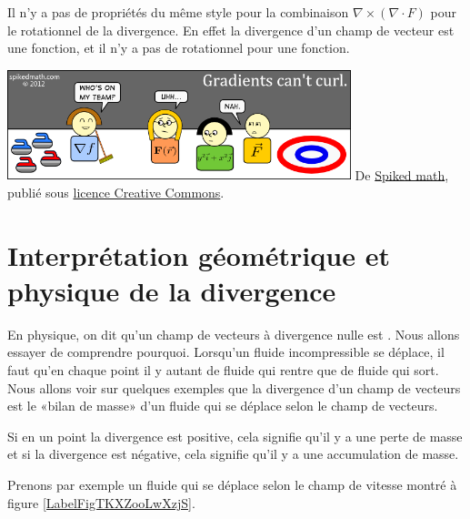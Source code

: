 \begin{remark}
    Il n'y a pas de propriétés du même style pour la combinaison $\nabla\times(\nabla\cdot F)$ pour le rotationnel de la divergence. En effet la divergence d'un champ de vecteur est une fonction, et il n'y a pas de rotationnel pour une fonction.
\end{remark}

\begin{center}
            \includegraphics[width=10cm]{501-curling-with-gradients.png}
        {\tiny De \href{http://spikedmath.com/501.html}{Spiked math}, publié sous \href{http://creativecommons.org/licenses/by-nc-sa/2.5/ca/}{licence Creative Commons}.}
\end{center}


\section[Interprétation de la divergence]{Interprétation géométrique et physique de la divergence}


En physique, on dit qu'un champ de vecteurs à divergence nulle est . Nous allons essayer de comprendre pourquoi. Lorsqu'un fluide incompressible se déplace, il faut qu'en chaque point il y autant de fluide qui rentre que de fluide qui sort. Nous allons voir sur quelques exemples que la divergence d'un champ de vecteurs est le «bilan de masse» d'un fluide qui se déplace selon le champ de vecteurs.

Si en un point la divergence est positive, cela signifie qu'il y a une perte de masse et si la divergence est négative, cela signifie qu'il y a une accumulation de masse.

Prenons par exemple un fluide qui se déplace selon le champ de vitesse montré à figure \ref{LabelFigTKXZooLwXzjS}.
\newcommand{\CaptionFigTKXZooLwXzjS}{Le champ de vecteurs $F(x,y)=\frac{1}{ x }(1,0)$.}


